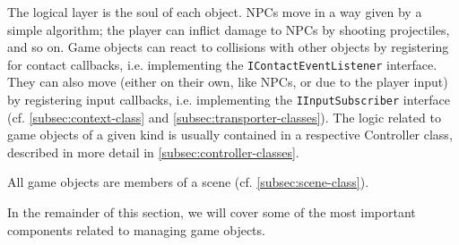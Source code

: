 The logical layer is the soul of each object.
NPCs move in a way given by a simple algorithm;
the player can inflict damage to NPCs by shooting projectiles, and so on.
Game objects can react to collisions with other objects by registering for contact callbacks, i.e. implementing the \texttt{IContactEventListener} interface.
They can also move (either on their own, like NPCs, or due to the player input) by registering input callbacks, i.e. implementing the \texttt{IInputSubscriber} interface (cf. \autoref{subsec:context-class} and \autoref{subsec:transporter-classes}).
The logic related to game objects of a given kind is usually contained in a respective Controller class, described in more detail in \autoref{subsec:controller-classes}.

All game objects are members of a scene (cf. \autoref{subsec:scene-class}).

In the remainder of this section, we will cover some of the most important components related to managing game objects.






